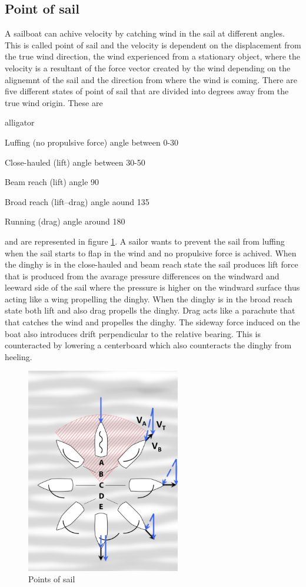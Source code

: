 \subsection{Point of sail}
A sailboat can achive velocity by catching wind in the sail at different angles. This is called point of sail and the velocity is dependent on the displacement from the true wind direction, the wind experienced from a stationary object, where the velocity is a resultant of the force vector created by the wind depending on the alignemnt of the sail and the direction from where the wind is coming. There are five different states of point of sail that are divided into degrees away from the true wind origin. These are
\begin{labeling}{alligator}
\item [Luffing] (no propulsive force) angle between 0-30\degree
\item [Close-hauled] (lift) angle between 30-50\degree
\item [Beam reach] (lift) angle 90\degree
\item [Broad reach] (lift–drag) angle aound 135\degree
\item [Running] (drag) angle around 180\degree
\end{labeling}
and are represented in figure \ref{points-sail}. A sailor wants to prevent the sail from luffing when the sail starts to flap in the wind and no propulsive force is achived. When the dinghy is in the close-hauled and beam reach state the sail produces lift force that is produced from the avarage pressure differences on the windward and leeward side of the sail where the pressure is higher on the windward surface thus acting like a wing propelling the dinghy. When the dinghy is in the broad reach state both lift and also drag propells the dinghy. Drag acts like a parachute that that catches the wind and propelles the dinghy. The sideway force induced on the boat also introduces drift perpendicular to the relative bearing. This is counteracted by lowering a centerboard which also counteracts the dinghy from heeling.
\begin{figure}[H]
\centering
\includegraphics[width=0.6\textwidth]{Figures/Points_of_sail.jpg}
\caption{Points of sail}
\label{points-sail}
\end{figure}
